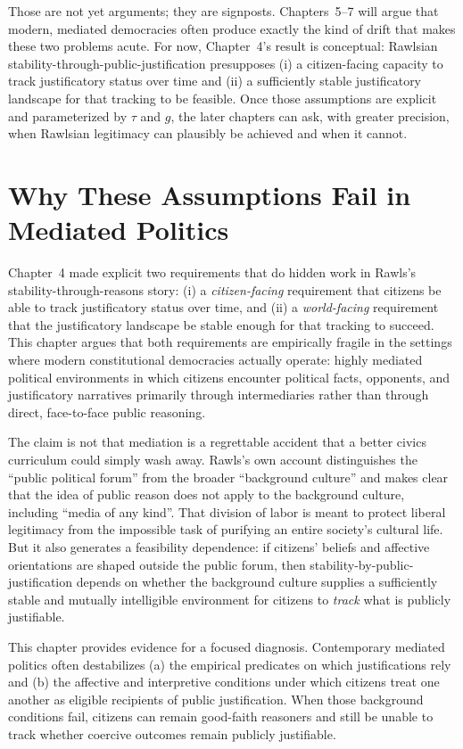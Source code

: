 \documentclass[12pt]{report}
\begin{document}
Those are not yet arguments; they are signposts. Chapters~5--7 will argue that modern, mediated democracies often produce exactly the kind of drift that makes these two problems acute. For now, Chapter~4’s result is conceptual: Rawlsian stability-through-public-justification presupposes (i) a citizen-facing capacity to track justificatory status over time and (ii) a sufficiently stable justificatory landscape for that tracking to be feasible. Once those assumptions are explicit and parameterized by \(\tau\) and \(g\), the later chapters can ask, with greater precision, when Rawlsian legitimacy can plausibly be achieved and when it cannot.

\chapter{Why These Assumptions Fail in Mediated Politics}

Chapter~4 made explicit two requirements that do hidden work in Rawls’s stability-through-reasons story: (i) a \emph{citizen-facing} requirement that citizens be able to track justificatory status over time, and (ii) a \emph{world-facing} requirement that the justificatory landscape be stable enough for that tracking to succeed. This chapter argues that both requirements are empirically fragile in the settings where modern constitutional democracies actually operate: highly mediated political environments in which citizens encounter political facts, opponents, and justificatory narratives primarily through intermediaries rather than through direct, face-to-face public reasoning.

The claim is not that mediation is a regrettable accident that a better civics curriculum could simply wash away. Rawls’s own account distinguishes the \enquote{public political forum} from the broader \enquote{background culture} and makes clear that the idea of public reason does not apply to the background culture, including \enquote{media of any kind}.\parencite[pp.~767--768]{rawls1997public} That division of labor is meant to protect liberal legitimacy from the impossible task of purifying an entire society’s cultural life. But it also generates a feasibility dependence: if citizens’ beliefs and affective orientations are shaped outside the public forum, then stability-by-public-justification depends on whether the background culture supplies a sufficiently stable and mutually intelligible environment for citizens to \emph{track} what is publicly justifiable.

This chapter provides evidence for a focused diagnosis. Contemporary mediated politics often destabilizes (a) the empirical predicates on which justifications rely and (b) the affective and interpretive conditions under which citizens treat one another as eligible recipients of public justification. When those background conditions fail, citizens can remain good-faith reasoners and still be unable to track whether coercive outcomes remain publicly justifiable.
\end{document}
